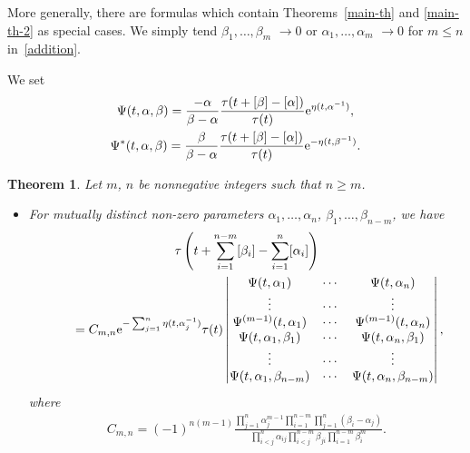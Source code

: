 \documentclass[pdftex]{sigma}
\numberwithin{equation}{section}
\newtheorem{Theorem}{Theorem}[section]
\theoremstyle{definition}
\begin{document}
More generally, there are formulas which contain Theorems~\ref{main-th} and \ref{main-th-2} as
special cases. We simply tend $\beta_1,\dots ,\beta_m$ $\to 0$ or $\alpha_1,\dots ,\alpha_m$ $\to 0$ for $m\leq n$ in~\eqref{addition}.

We set
\begin{gather}%
\Psi(t,\alpha,\beta)
=
\frac{-\alpha}{\beta-\alpha}\frac{\tau(t+[\beta]-[\alpha])}{\tau(t)}
{\rm e}^{\eta(t,\alpha^{-1})},
\label{psi-beta-alpha}
\\
\Psi^\ast(t,\alpha,\beta)
=
\frac{\beta}{\beta-\alpha}\frac{\tau(t+[\beta]-[\alpha])}{\tau(t)}
{\rm e}^{-\eta(t,\beta^{-1})}.\nonumber
\end{gather}


\begin{Theorem}\label{main-th-3} Let $m$, $n$ be nonnegative integers such that $n\geq m$.
\begin{itemize}\itemsep=0pt
\item[$(i)$] For mutually distinct non-zero parameters $\alpha_1,\dots ,\alpha_n$, $\beta_1,\dots , \beta_{n-m}$, we have
\begin{gather*}
\tau\left(t+\sum_{i=1}^{n-m}[\beta_i]-\sum_{i=1}^n[\alpha_i]\right)\\
\qquad
=
C_{m,n}
{\rm e}^{-\sum_{j=1}^n\eta(t,\alpha_j^{-1})}
\tau(t)
\left|
\begin{matrix}
\Psi(t,\alpha_1)&\cdots&\Psi(t,\alpha_n)\\
\vdots&\cdots&\vdots\\
\Psi^{(m-1)}(t,\alpha_1)&\cdots&\Psi^{(m-1)}(t,\alpha_n)\\
\Psi(t,\alpha_1,\beta_1)&\cdots&\Psi(t,\alpha_n,\beta_1)\\
\vdots&\cdots&\vdots\\
\Psi(t,\alpha_1,\beta_{n-m})&\cdots&\Psi(t,\alpha_n,\beta_{n-m})\\
\end{matrix}
\right|,
\end{gather*}
where
\begin{gather*}
C_{m,n}=(-1)^{n(m-1)}\frac{\prod_{j=1}^n\alpha_j^{m-1}\prod_{i=1}^{n-m}\prod_{j=1}^n(\beta_i-\alpha_j)}
{\prod_{i<j}^n\alpha_{ij}\prod_{i<j}^{n-m}\beta_{ji}\prod_{i=1}^{n-m}\beta_i^m}.
\end{gather*}


\end{itemize}
\end{Theorem}
\end{document}
